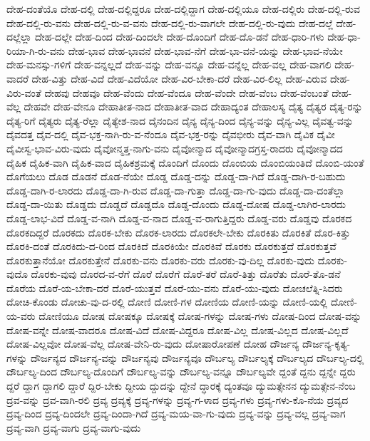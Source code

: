 {ದೇಹ-ದಂತೆಯೊ
ದೇಹ-ದಲ್ಲಿ
ದೇಹ-ದಲ್ಲಿದ್ದರೂ
ದೇಹ-ದಲ್ಲಿದ್ದಾಗ
ದೇಹ-ದಲ್ಲಿಯೂ
ದೇಹ-ದಲ್ಲಿರು
ದೇಹ-ದಲ್ಲಿ-ರುವ
ದೇಹ-ದಲ್ಲಿ-ರು-ವನು
ದೇಹ-ದಲ್ಲಿ-ರು-ವ-ವನು
ದೇಹ-ದಲ್ಲಿ-ರು-ವಾಗಲೇ
ದೇಹ-ದಲ್ಲಿ-ರು-ವುದು
ದೇಹ-ದಲ್ಲೆ
ದೇಹ-ದಲ್ಲೆಲ್ಲಾ
ದೇಹ-ದಲ್ಲೇ
ದೇಹ-ದಿಂದ
ದೇಹ-ದಿಂದಲೇ
ದೇಹ-ದೊಂದಿಗೆ
ದೇಹ-ದೊ-ಡನೆ
ದೇಹ-ಧಾರಿ-ಗಳು
ದೇಹ-ಧಾ-ರಿಯಾ-ಗಿ-ರು-ವನು
ದೇಹ-ಭಾವ
ದೇಹ-ಭಾವನೆ
ದೇಹ-ಭಾವ-ನೆಗೆ
ದೇಹ-ಭಾ-ವನೆ-ಯನ್ನು
ದೇಹ-ಭಾವ-ನೆಯೇ
ದೇಹ-ಮನಸ್ಸು-ಗಳಿಗೆ
ದೇಹ-ವನ್ನಲ್ಲದೆ
ದೇಹ-ವನ್ನು
ದೇಹ-ವನ್ನೂ
ದೇಹ-ವನ್ನೆಲ್ಲ
ದೇಹ-ವಲ್ಲ
ದೇಹ-ವಾಗಲಿ
ದೇಹ-ವಾದರೆ
ದೇಹ-ವಿತ್ತು
ದೇಹ-ವಿದೆ
ದೇಹ-ವಿದೆಯೋ
ದೇಹ-ವಿರ-ಬೇಕಾ-ದರೆ
ದೇಹ-ವಿರ-ಲಿಲ್ಲ
ದೇಹ-ವಿರುವ
ದೇಹ-ವಿರು-ವಂತೆ
ದೇಹವು
ದೇಹವೂ
ದೇಹ-ವೆಂದು
ದೇಹ-ವೆಂದೂ
ದೇಹ-ವೆಂದೇ
ದೇಹ-ವೆಂಬ
ದೇಹ-ವೆಂಬಂತೆ
ದೇಹ-ವೆಲ್ಲ
ದೇಹವೇ
ದೇಹ-ವೇನೂ
ದೇಹಾತೀತ-ನಾದ
ದೇಹಾತೀತ-ವಾದ
ದೇಹಾದ್ಯಂತ
ದೇಹಾಲಸ್ಯ
ದೈತ್ಯ
ದೈತ್ಯರ
ದೈತ್ಯ-ರನ್ನು
ದೈತ್ಯ-ರಿಗೆ
ದೈತ್ಯರು
ದೈತ್ಯ-ರೆಲ್ಲಾ
ದೈತ್ಯೇಶ-ನಾದ
ದೈನಂದಿನ
ದೈನ್ಯ
ದೈನ್ಯ-ದಿಂದ
ದೈನ್ಯ-ವನ್ನು
ದೈನ್ಯ-ವಿಲ್ಲ
ದೈವತ್ವ-ವನ್ನು
ದೈವದತ್ತ
ದೈವ-ದಲ್ಲಿ
ದೈವ-ಭಕ್ತ-ನಾಗಿ-ರು-ವ-ನೆಂದೂ
ದೈವ-ಭಕ್ತ-ರನ್ನು
ದೈವಭೀರು
ದೈವ-ವಾಗಿ
ದೈವಿಕ
ದೈವೀ
ದೈವೀಸ್ವ-ಭಾವ-ವಿರು-ವುದು
ದೈವೋನ್ಮತ್ತ-ನಾಗು-ವನು
ದೈವೋನ್ಮಾದ
ದೈವೋನ್ಮಾದಗ್ರಸ್ತ-ರಾದರು
ದೈವೋನ್ಮಾದದ
ದೈಹಿಕ
ದೈಹಿಕ-ವಾಗಿ
ದೈಹಿಕ-ವಾದ
ದೈಹಿಕಶ್ರಮಕ್ಕೆ
ದೊಂದಿಗೆ
ದೊಂದು
ದೊಂಬಿಯ
ದೊಂಬಿಯಂತಿದೆ
ದೊಂಬಿ-ಯಂತೆ
ದೊಗೆಯಲು
ದೊಡ
ದೊಡನೆ
ದೊಡ-ನೆಯೇ
ದೊಡ್ಡ
ದೊಡ್ಡ-ದನ್ನು
ದೊಡ್ಡ-ದಾ-ಗಿದೆ
ದೊಡ್ಡ-ದಾಗಿ-ರ-ಬಹುದು
ದೊಡ್ಡ-ದಾಗಿ-ರ-ಲಾರದು
ದೊಡ್ಡ-ದಾ-ಗಿ-ರುವ
ದೊಡ್ಡ-ದಾ-ಗುತ್ತಾ
ದೊಡ್ಡ-ದಾ-ಗು-ವುದು
ದೊಡ್ಡ-ದಾ-ದಂತೆಲ್ಲಾ
ದೊಡ್ಡ-ದಾ-ಯಿತು
ದೊಡ್ಡದು
ದೊಡ್ಡದೆ
ದೊಡ್ಡದೊ
ದೊಡ್ಡ-ದೊಂದು
ದೊಡ್ಡ-ದೋಷ
ದೊಡ್ಡ-ಲಾಗಿರ-ಲಾರದು
ದೊಡ್ಡ-ಲಾಭ-ವಿದೆ
ದೊಡ್ಡ-ವ-ನಾಗಿ
ದೊಡ್ಡ-ವ-ನಾದ
ದೊಡ್ಡ-ವ-ರಾಗುತ್ತಿದ್ದರು
ದೊಡ್ಡ-ವರು
ದೊಡ್ಡವು
ದೊರಕದ
ದೊರಕದಿದ್ದರೆ
ದೊರಕದು
ದೊರಕ-ಬೇಕು
ದೊರಕ-ಲಾರದು
ದೊರಕಲೇ-ಬೇಕು
ದೊರಕಿತು
ದೊರಕಿತೆ
ದೊರ-ಕಿತ್ತು
ದೊರಕಿ-ದಂತೆ
ದೊರಕಿದು-ದ-ರಿಂದ
ದೊರಕಿದೆ
ದೊರಕಿಯೇ
ದೊರಕಿವೆ
ದೊರಕು
ದೊರಕುತ್ತದೆ
ದೊರಕುತ್ತವೆ
ದೊರಕುತ್ತಾನೆಯೋ
ದೊರಕುತ್ತೇನೆ
ದೊರಕು-ವನು
ದೊರಕು-ವರು
ದೊರಕು-ವು-ದಿಲ್ಲ
ದೊರಕು-ವುದು
ದೊರಕು-ವುದೊ
ದೊರಕು-ವುವು
ದೊರದ-ವ-ರೆಗೆ
ದೊರೆ
ದೊರೆಗೆ
ದೊರೆ-ತರೆ
ದೊರೆ-ತಿತ್ತು
ದೊರೆತು
ದೊರೆ-ತೊ-ಡನೆ
ದೊರೆಯ
ದೊರೆ-ಯ-ಬೇಕಾ-ದರೆ
ದೊರೆ-ಯುತ್ತವೆ
ದೊರೆ-ಯು-ವನು
ದೊರೆ-ಯು-ವುದು
ದೋಚಲೆತ್ನಿ-ಸಿದರು
ದೋಚಿ-ಕೊಂಡು
ದೋಚು-ವು-ದ-ರಲ್ಲಿ
ದೋಣಿ
ದೋಣಿ-ಗಳ
ದೋಣಿಯ
ದೋಣಿ-ಯನ್ನು
ದೋಣಿ-ಯಲ್ಲಿ
ದೋಣಿ-ಯ-ವರು
ದೋಣಿಯೂ
ದೋಷ
ದೋಷಕ್ಕೂ
ದೋಷಕ್ಕೆ
ದೋಷ-ಗಳನ್ನು
ದೋಷ-ಗಳು
ದೋಷ-ದಿಂದ
ದೋಷ-ವನ್ನು
ದೋಷ-ವನ್ನೇ
ದೋಷ-ವಾದರೂ
ದೋಷ-ವಿದೆ
ದೋಷ-ವಿದ್ದರೂ
ದೋಷ-ವಿಲ್ಲ
ದೋಷ-ವಿಲ್ಲದ
ದೋಷ-ವಿಲ್ಲದೆ
ದೋಷ-ವಿಲ್ಲವೋ
ದೋಷ-ವೆಲ್ಲ
ದೋಷ-ವೇನಿ-ರು-ವುದು
ದೋಷಾರೋಪಣೆ
ದೋಹ
ದೌರ್ಜನ್ಯ
ದೌರ್ಜನ್ಯ-ಕೃತ್ಯ-ಗಳನ್ನು
ದೌರ್ಜನ್ಯದ
ದೌರ್ಜನ್ಯ-ವನ್ನು
ದೌರ್ಜನ್ಯವು
ದೌರ್ಜನ್ಯವೂ
ದೌರ್ಬಲ್ಯ
ದೌರ್ಬಲ್ಯಕ್ಕೆ
ದೌರ್ಬಲ್ಯದ
ದೌರ್ಬಲ್ಯ-ದಲ್ಲಿ
ದೌರ್ಬಲ್ಯ-ದಿಂದ
ದೌರ್ಬಲ್ಯ-ದೊಂದಿಗೆ
ದೌರ್ಬಲ್ಯ-ವನ್ನು
ದೌರ್ಬಲ್ಯ-ವನ್ನೂ
ದೌರ್ಬಲ್ಯವೇ
ದ್ದಂತೆ
ದ್ದನು
ದ್ದನ್ನೇ
ದ್ದರು
ದ್ದರೆ
ದ್ದಾಗ
ದ್ದಾಗಲಿ
ದ್ದಾರೆ
ದ್ದಿರ-ಬೇಕು
ದ್ದೀಯ
ದ್ದುದನ್ನು
ದ್ದೇನೆ
ದ್ಧಾರಕ್ಕೆ
ದ್ಯಂತವೂ
ದ್ಯುಮತ್ಸೇನನ
ದ್ಯುಮತ್ಸೇನ-ನೆಂಬ
ದ್ರವ-ವನ್ನು
ದ್ರವ-ವಾಗಿ-ರಲಿ
ದ್ರವ್ಯ
ದ್ರವ್ಯಕ್ಕೆ
ದ್ರವ್ಯ-ಗಳನ್ನು
ದ್ರವ್ಯ-ಗ-ಳಾದ
ದ್ರವ್ಯ-ಗಳು
ದ್ರವ್ಯ-ಗಳು-ಕೊ-ನೆಯ
ದ್ರವ್ಯದ
ದ್ರವ್ಯ-ದಿಂದ
ದ್ರವ್ಯ-ದಿಂದಲೇ
ದ್ರವ್ಯ-ದಿಂದಾ-ಗಿದೆ
ದ್ರವ್ಯ-ಮಯ-ವಾ-ಗು-ವುದು
ದ್ರವ್ಯ-ವನ್ನು
ದ್ರವ್ಯ-ವಲ್ಲ
ದ್ರವ್ಯ-ವಾಗ
ದ್ರವ್ಯ-ವಾಗಿ
ದ್ರವ್ಯ-ವಾಗು
ದ್ರವ್ಯ-ವಾಗು-ವುದು
}
